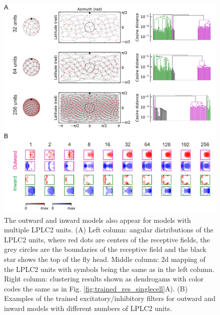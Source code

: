 \documentclass[pdftex,9pt,lineno]{elife}
\begin{document}
\begin{figure}
\includegraphics[width=\linewidth]{figures/trained_results_multicells_paper.pdf}
\caption{The outward and inward models also appear for models with multiple LPLC2 units. (A) Left column: angular distributions of the LPLC2 units, where red dots are centers of the receptive fields, the grey circles are the boundaries of the receptive field and the black star shows the top of the fly head. Middle column: 2d mapping of the LPLC2 units with symbols being the same as in the left column. Right column: clustering results shown as dendrogams with color codes the same as in Fig. \ref{fig:trained_res_singlecell}A). (B) Examples of the trained excitatory/inhibitory filters for outward and inward models with different numbers of LPLC2 units.}
\label{fig:trained_res_multicells}

\end{figure}
\end{document}
